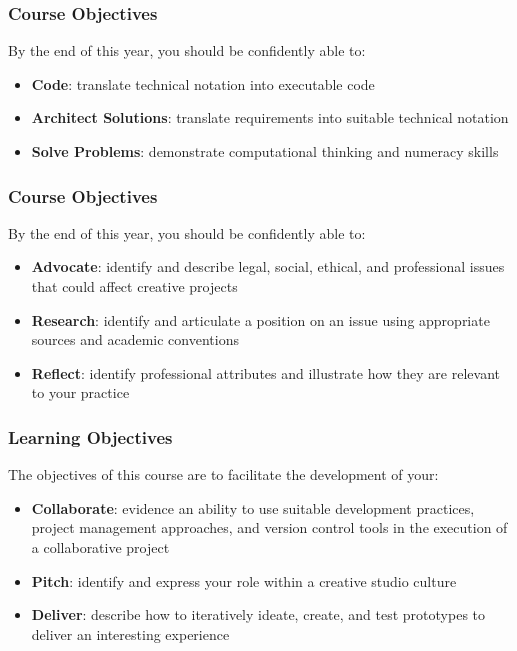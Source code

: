 \begin{frame}
	\frametitle{Course Objectives}
	
	By the end of this year, you should be confidently able to: \pause
	
	\begin{itemize}
		\item \textbf{Code}: translate technical notation into executable code \pause
		\item \textbf{Architect Solutions}: translate requirements into suitable technical notation \pause
		\item \textbf{Solve Problems}: demonstrate computational thinking and numeracy skills \pause
	\end{itemize}
\end{frame}

\begin{frame}
	\frametitle{Course Objectives}
	
	By the end of this year, you should be confidently able to: \pause
	
	\begin{itemize}
		\item \textbf{Advocate}: identify and describe legal, social, ethical, and professional issues that could affect creative projects \pause
		\item \textbf{Research}: identify and articulate a position on an issue using appropriate sources and academic conventions \pause
		\item \textbf{Reflect}: identify professional attributes and illustrate how they are relevant to your practice
	\end{itemize}
\end{frame}

\begin{frame}
	\frametitle{Learning Objectives}
	
	The objectives of this course are to facilitate the development of your:
	
	\begin{itemize}
		\item \textbf{Collaborate}: evidence an ability to use suitable development practices, project management approaches, and version control tools in the execution of a collaborative project \pause
		\item \textbf{Pitch}: identify and express your role within a creative studio culture \pause
		\item \textbf{Deliver}: describe how to iteratively ideate, create, and test prototypes to deliver an interesting experience
	\end{itemize}
\end{frame}


